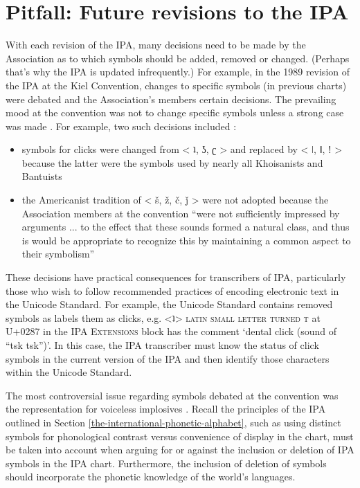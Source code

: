 \section{Pitfall: Future revisions to the IPA}
\label{ipa-revisions}

With each revision of the IPA, many decisions need to be made by 
the Association as to which symbols should be added, removed or 
changed. (Perhaps that's why the IPA is updated infrequently.) 
For example, in the 1989 revision of the IPA at the Kiel Convention, 
changes to specific symbols (in previous charts) were debated and 
the Association's members certain decisions. The prevailing mood at 
the convention was not to change specific symbols unless a strong 
case was made \cite{Ladefoged1990a}. For example, two such decisions 
included \cite[62]{Ladefoged1990a}:

\begin{itemize}
	\item symbols for clicks were changed from < ʇ, ʖ, ʗ > and replaced by < ǀ, ǁ, ǃ > because the latter were the symbols used by nearly all Khoisanists and Bantuists
	\item the Americanist tradition of < š, ž, č, ǰ > were not adopted because the Association members at the convention ``were not sufficiently impressed by arguments ... to the effect that these sounds formed a natural class, and thus is would be appropriate to recognize this by maintaining a common aspect to their symbolism''
\end{itemize}

\noindent These decisions have practical consequences for transcribers 
of IPA, particularly those who wish to follow recommended practices of 
encoding electronic text in the Unicode Standard. For example, the Unicode 
Standard contains removed symbols as labels them as clicks, e.g. <ʇ> 
\textsc{latin small letter turned t} at U+0287 in the \textsc{IPA Extensions} 
block has the comment `dental click (sound of ``tsk tsk'')'. In this case, 
the IPA transcriber must know the status of click symbols in the current 
version of the IPA and then identify those characters within the Unicode Standard. 

The most controversial issue regarding symbols debated at the convention 
was the representation for voiceless implosives \cite[62]{Ladefoged1990a}. 
Recall the principles of the IPA outlined in Section \ref{the-international-phonetic-alphabet}, 
such as using distinct symbols for phonological contrast versus convenience of 
display in the chart, must be taken into account when arguing for or against 
the inclusion or deletion of IPA symbols in the IPA chart. Furthermore, the 
inclusion of deletion of symbols should incorporate the phonetic knowledge 
of the world's languages.

